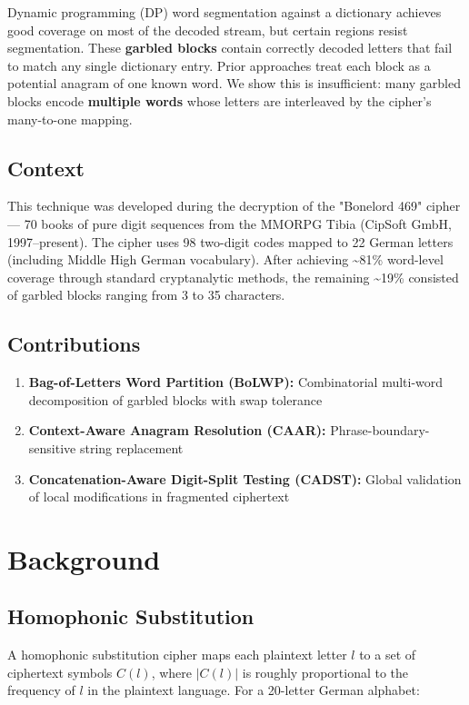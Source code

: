 \documentclass[11pt,a4paper]{article}
\begin{document}
Dynamic programming (DP) word segmentation against a dictionary achieves good coverage on most of the decoded stream, but certain regions resist segmentation. These \textbf{garbled blocks} contain correctly decoded letters that fail to match any single dictionary entry. Prior approaches treat each block as a potential anagram of one known word. We show this is insufficient: many garbled blocks encode \textbf{multiple words} whose letters are interleaved by the cipher's many-to-one mapping.

\subsection{Context}

This technique was developed during the decryption of the "Bonelord 469" cipher --- 70 books of pure digit sequences from the MMORPG Tibia (CipSoft GmbH, 1997–present). The cipher uses 98 two-digit codes mapped to 22 German letters (including Middle High German vocabulary). After achieving \textasciitilde81\% word-level coverage through standard cryptanalytic methods, the remaining \textasciitilde19\% consisted of garbled blocks ranging from 3 to 35 characters.

\subsection{Contributions}

\begin{enumerate}
\item \textbf{Bag-of-Letters Word Partition (BoLWP):} Combinatorial multi-word decomposition of garbled blocks with swap tolerance
\item \textbf{Context-Aware Anagram Resolution (CAAR):} Phrase-boundary-sensitive string replacement
\item \textbf{Concatenation-Aware Digit-Split Testing (CADST):} Global validation of local modifications in fragmented ciphertext
\end{enumerate}

\section{Background}

\subsection{Homophonic Substitution}

A homophonic substitution cipher maps each plaintext letter $l$ to a set of ciphertext symbols $C(l)$, where $|C(l)|$ is roughly proportional to the frequency of $l$ in the plaintext language. For a 20-letter German alphabet:
\end{document}
